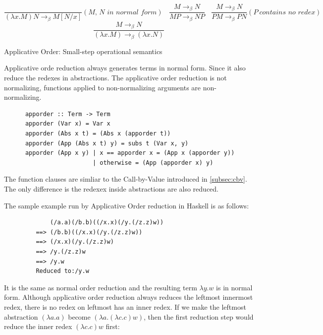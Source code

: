 \begin{equation*}
\frac{}{(\lambda x.M)N \rightarrow _\beta M[N/x]}(\textit{M, N in normal form})\ \ \ \ 
\frac{M \rightarrow _\beta N}{MP \rightarrow _\beta NP}\ \ \ \ 
\frac{M \rightarrow _\beta N}{PM \rightarrow _\beta PN}(P\ \textit{contains no redex})\ \ \ \ 
\end{equation*}
\begin{equation*}
\frac{M \rightarrow _\beta N}{(\lambda x.M) \rightarrow _\beta (\lambda x.N)}
\end{equation*}
\begin{center}
Applicative Order: Small-step operational semantics
\end{center}

Applicative orde reduction always generates terms in normal form. Since it also reduce the redexes in abstractions. The applicative order reduction is not normalizing, functions applied to non-normalizing arguments are non-normalizing.



\begin{verbatim}
      apporder :: Term -> Term
      apporder (Var x) = Var x
      apporder (Abs x t) = (Abs x (apporder t))
      apporder (App (Abs x t) y) = subs t (Var x, y)
      apporder (App x y) | x == apporder x = (App x (apporder y))
                         | otherwise = (App (apporder x) y)  
\end{verbatim}

The function clauses are simliar to the Call-by-Value introduced in \ref{subsec:cbv}. The only difference is the redexex inside abstractions are also reduced.

\begin{exmp}
\normalfont The sample example run by Applicative Order reduction in Haskell is as follows:
\end{exmp}

\begin{verbatim}
             (/a.a)(/b.b)((/x.x)(/y.(/z.z)w))
         ==> (/b.b)((/x.x)(/y.(/z.z)w))
         ==> (/x.x)(/y.(/z.z)w)
         ==> /y.(/z.z)w
         ==> /y.w
         Reduced to:/y.w
\end{verbatim}

It is the same as normal order reduction and the resulting term $\lambda y.w$ is in normal form. Although applicative order reduction always reduces the leftmost innermost redex, there is no redex on leftmost has an inner redex. If we make the leftmost abstraction $(\lambda a.a)$ become $(\lambda a.(\lambda c.c)w)$, then the first reduction step would reduce the inner redex $(\lambda c.c)w$ first:


